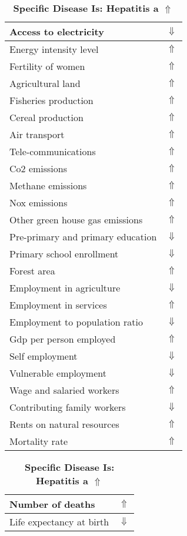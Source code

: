 \documentclass[12pt,notitlepage,oneside]{report}
\begin{document}
\begin{table}[!htb]
\caption{\textbf{Specific Disease Is: Hepatitis a $\Uparrow$}}
\centering
\label{Correlated Socio-economic Factors0}
\begin{tabular}{|l|l|}
\hline
Access to electricity & $\Downarrow$\\ \hline
Energy intensity level & $\Uparrow$\\ \hline
Fertility of women & $\Uparrow$\\ \hline
Agricultural land & $\Uparrow$\\ \hline
Fisheries production & $\Uparrow$\\ \hline
Cereal production & $\Uparrow$\\ \hline
Air transport  & $\Uparrow$\\ \hline
Tele-communications & $\Uparrow$\\ \hline
Co2 emissions & $\Uparrow$\\ \hline
Methane emissions & $\Uparrow$\\ \hline
Nox emissions & $\Uparrow$\\ \hline
Other green house gas emissions & $\Uparrow$\\ \hline
Pre-primary and primary education & $\Downarrow$\\ \hline
Primary school enrollment & $\Downarrow$\\ \hline
Forest area & $\Uparrow$\\ \hline
Employment in agriculture & $\Downarrow$\\ \hline
Employment in services & $\Uparrow$\\ \hline
Employment to population ratio & $\Downarrow$\\ \hline
Gdp per person employed & $\Uparrow$\\ \hline
Self employment & $\Downarrow$\\ \hline
Vulnerable employment & $\Downarrow$\\ \hline
Wage and salaried workers & $\Uparrow$\\ \hline
Contributing family workers & $\Downarrow$\\ \hline
Rents on natural resources & $\Uparrow$\\ \hline
Mortality rate & $\Uparrow$\\ \hline
\end{tabular}
\begin{tabular}{|l|l|}
\hline
Number of deaths & $\Uparrow$\\ \hline
Life expectancy at birth & $\Downarrow$\\ \hline

\end{tabular}
\end{table}
\end{document}
